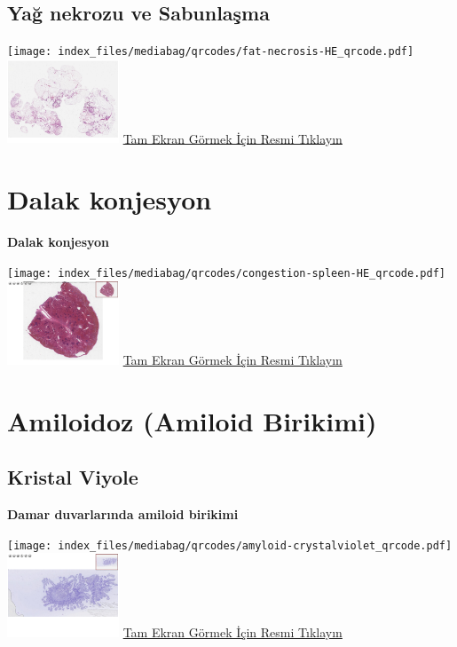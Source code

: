 \documentclass[
  letterpaper,
  DIV=11,
  numbers=noendperiod]{scrreprt}
\begin{document}
\section{Yağ nekrozu ve Sabunlaşma}\label{sec-yag-nekrozu-sabunlasma}

\texttt{[image: index\_files/mediabag/qrcodes/fat-necrosis-HE\_qrcode.pdf]}
\href{https://images.patolojiatlasi.com/fat-necrosis/HE.html}{\includegraphics[width=0.25\textwidth,height=\textheight]{./screenshots/thumbnail_fat-necrosis.png}}
\href{https://images.patolojiatlasi.com/fat-necrosis/HE.html}{Tam Ekran
Görmek İçin Resmi Tıklayın}

\chapter{Dalak konjesyon}\label{sec-congestion-spleen}

\textbf{Dalak konjesyon}

\texttt{[image: index\_files/mediabag/qrcodes/congestion-spleen-HE\_qrcode.pdf]}
\href{https://images.patolojiatlasi.com/congestion-spleen/HE.html}{\includegraphics[width=0.25\textwidth,height=\textheight]{./screenshots/thumbnail_congestion-spleen.png}}
\href{https://images.patolojiatlasi.com/congestion-spleen/HE.html}{Tam
Ekran Görmek İçin Resmi Tıklayın}

\chapter{Amiloidoz (Amiloid Birikimi)}\label{sec-amiloidoz}

\section{Kristal Viyole}\label{sec-amiloidoz-kristal-viyole}

\textbf{Damar duvarlarında amiloid birikimi}

\texttt{[image: index\_files/mediabag/qrcodes/amyloid-crystalviolet\_qrcode.pdf]}
\href{https://images.patolojiatlasi.com/amyloid/crystalviolet.html}{\includegraphics[width=0.25\textwidth,height=\textheight]{./screenshots/thumbnail_crystalviolet.png}}
\href{https://images.patolojiatlasi.com/amyloid/crystalviolet.html}{Tam
Ekran Görmek İçin Resmi Tıklayın}
\end{document}
